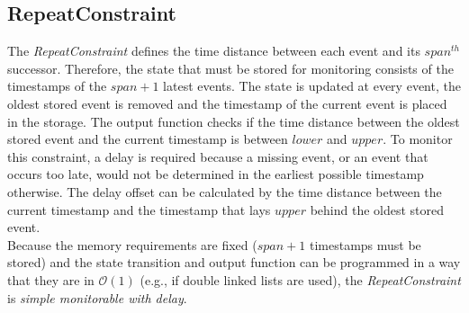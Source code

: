 \subsection{RepeatConstraint}
	The \emph{RepeatConstraint} defines the time distance between each event and its $span^{th}$ successor. Therefore, the state that must be stored for monitoring consists of the timestamps of the $span+1$ latest events. The state is updated at every event, the oldest stored event is removed and the timestamp of the current event is placed in the storage. The output function checks if the time distance between the oldest stored event and the current timestamp is between $lower$ and $upper$. To monitor this constraint, a delay is required because a missing event, or an event that occurs too late, would not be determined in the earliest possible timestamp otherwise. The delay offset can be calculated by the time distance between the current timestamp and the timestamp that lays $upper$ behind the oldest stored event.\\
	Because the memory requirements are fixed ($span+1$ timestamps must be stored) and the state transition and output function can be programmed in a way that they are in  $\mathcal O(1)$ (e.g., if double linked lists are used), the \emph{RepeatConstraint} is \textit{simple monitorable with delay}.

